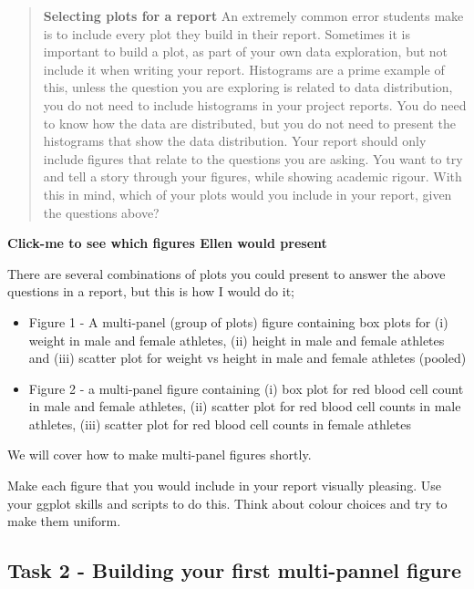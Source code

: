 \documentclass[
]{book}
\providecommand{\tightlist}{%
  \setlength{\itemsep}{0pt}\setlength{\parskip}{0pt}}
\begin{document}
\begin{quote}
\textbf{Selecting plots for a report}
An extremely common error students make is to include every plot they build in their report. Sometimes it is important to build a plot, as part of your own data exploration, but not include it when writing your report. Histograms are a prime example of this, unless the question you are exploring is related to data distribution, you do not need to include histograms in your project reports. You do need to know how the data are distributed, but you do not need to present the histograms that show the data distribution. Your report should only include figures that relate to the questions you are asking. You want to try and tell a story through your figures, while showing academic rigour. With this in mind, which of your plots would you include in your report, given the questions above?
\end{quote}

\textbf{Click-me to see which figures Ellen would present}

There are several combinations of plots you could present to answer the above questions in a report, but this is how I would do it;

\begin{itemize}
\tightlist
\item
  Figure 1 - A multi-panel (group of plots) figure containing box plots for (i) weight in male and female athletes, (ii) height in male and female athletes and (iii) scatter plot for weight vs height in male and female athletes (pooled)
\item
  Figure 2 - a multi-panel figure containing (i) box plot for red blood cell count in male and female athletes, (ii) scatter plot for red blood cell counts in male athletes, (iii) scatter plot for red blood cell counts in female athletes
\end{itemize}

We will cover how to make multi-panel figures shortly.

Make each figure that you would include in your report visually pleasing. Use your ggplot skills and scripts to do this. Think about colour choices and try to make them uniform.

\hypertarget{task-2---building-your-first-multi-pannel-figure}{%
\subsection{Task 2 - Building your first multi-pannel figure}\label{task-2---building-your-first-multi-pannel-figure}}
\end{document}
